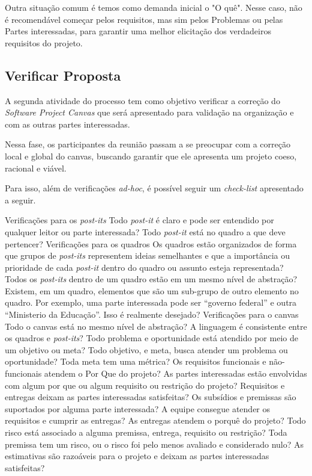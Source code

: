 \documentclass[a4]{report}
\begin{document}
Outra situação comum é temos como demanda inicial o "O quê". Nesse caso, não é recomendável começar pelos requisitos, mas sim pelos Problemas ou pelas Partes interessadas, para garantir uma melhor elicitação dos verdadeiros requisitos do projeto.



\subsection{Verificar Proposta}

A segunda atividade do processo tem como objetivo verificar a correção do \textit{Software Project Canvas} que será apresentado para validação na organização e com as outras partes interessadas.

Nessa fase, os participantes da reunião passam a se preocupar com a correção local e global do canvas, buscando garantir que ele apresenta um projeto coeso, racional e viável.

Para isso, além de verificações \textit{ad-hoc}, é possível seguir um \textit{check-list} apresentado a seguir.
\begin{outline}
    \1 Verificações para os \textit{post-its}
    \2 Todo \textit{post-it} é claro e pode ser entendido por qualquer leitor ou parte interessada?
    \2 Todo \textit{post-it} está no quadro a que deve pertencer?
    \1 Verificações para os quadros
    \2 Os quadros estão organizados de forma que grupos de \textit{post-its} representem ideias semelhantes e que a importância ou prioridade de cada \textit{post-it} dentro do quadro ou assunto esteja representada?
    \2 Todos os \textit{post-its} dentro de um quadro estão em um mesmo nível de abstração?
    \2 Existem, em um quadro, elementos que são um sub-grupo de outro elemento no quadro. Por exemplo, uma parte interessada pode ser ``governo federal'' e outra ``Ministerio da Educação''. Isso é realmente desejado?
    \1 Verificações para o canvas
    \2 Todo o canvas está no mesmo nível de abstração?
    \2 A linguagem é consistente entre os quadros e \textit{post-its}?
    \2 Todo problema e oportunidade está atendido por meio de um objetivo ou meta?
    \2 Todo objetivo, e meta, busca atender um problema ou oportunidade?
    \2 Toda meta tem uma métrica?
    \2 Os requisitos funcionais e não-funcionais atendem o Por Que do projeto?
    \2 As partes interessadas estão envolvidas com algum por que ou algum requisito ou restrição do projeto?
    \2 Requisitos e entregas deixam as partes interessadas satisfeitas?
    \2 Os subsídios e premissas são suportados por alguma parte interessada?
    \2 A equipe consegue atender os requisitos e cumprir as entregas?
    \2 As entregas atendem o porquê do projeto?
    \2 Todo risco está associado a alguma premissa, entrega, requisito ou restrição?
    \2 Toda premissa tem um risco, ou o risco foi pelo menos avaliado e considerado nulo?
    \2 As estimativas são razoáveis para o projeto e deixam as partes interessadas satisfeitas?
\end{outline}
\end{document}
